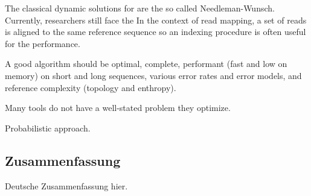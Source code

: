 The classical dynamic solutions for are the so called Needleman-Wunsch.
Currently, researchers still face the In the context of read mapping, a set of
reads is aligned to the same reference sequence so an indexing procedure is
often useful for the performance.

A good algorithm should be optimal, complete, performant (fast and low on
memory) on short and long sequences, various error rates and error models,
and reference complexity (topology and enthropy).



Many tools do not have a well-stated problem they optimize.

Probabilistic approach.

\endgroup

\cleardoublepage%

\begingroup
\let\clearpage\relax
\let\cleardoublepage\relax
\let\cleardoublepage\relax

\begin{otherlanguage}{ngerman}
\chapter*{Zusammenfassung}

Deutsche Zusammenfassung hier.

\end{otherlanguage}

\endgroup

\vfill